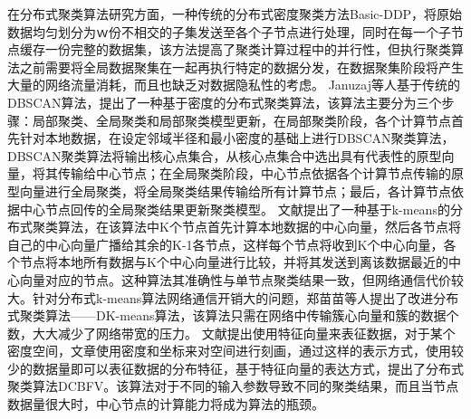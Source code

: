 在分布式聚类算法研究方面，一种传统的分布式密度聚类方法Basic-DDP，将原始数据均匀划分为ｗ份不相交的子集发送至各个子节点进行处理，同时在每一个子节点缓存一份完整的数据集，该方法提高了聚类计算过程中的并行性，但执行聚类算法之前需要将全局数据聚集在一起再执行特定的数据分发，在数据聚集阶段将产生大量的网络流量消耗，而且也缺乏对数据隐私性的考虑。
Januzaj等人基于传统的DBSCAN算法，提出了一种基于密度的分布式聚类算法，该算法主要分为三个步骤：局部聚类、全局聚类和局部聚类模型更新，在局部聚类阶段，各个计算节点首先针对本地数据，在设定邻域半径和最小密度的基础上进行DBSCAN聚类算法，DBSCAN聚类算法将输出核心点集合，从核心点集合中选出具有代表性的原型向量，将其传输给中心节点；在全局聚类阶段，中心节点依据各个计算节点传输的原型向量进行全局聚类，将全局聚类结果传输给所有计算节点；最后，各计算节点依据中心节点回传的全局聚类结果更新聚类模型。
文献\cite{kantabutra2000parallel}提出了一种基于k-means的分布式聚类算法，在该算法中K个节点首先计算本地数据的中心向量，然后各节点将自己的中心向量广播给其余的K-1各节点，这样每个节点将收到K个中心向量，各个节点将本地所有数据与K个中心向量进行比较，并将其发送到离该数据最近的中心向量对应的节点。这种算法其准确性与单节点聚类结果一致，但网络通信代价较大。针对分布式k-means算法网络通信开销大的问题，郑苗苗等人提出了改进分布式聚类算法——DK-means算法，该算法只需在网络中传输簇心向量和簇的数据个数，大大减少了网络带宽的压力。
文献\cite{李锁花基于特征向量的分布式聚类算法}提出使用特征向量来表征数据，对于某个密度空间，文章使用密度和坐标来对空间进行刻画，通过这样的表示方式，使用较少的数据量即可以表征数据的分布特征，基于特征向量的表达方式，提出了分布式聚类算法DCBFV。该算法对于不同的输入参数导致不同的聚类结果，而且当节点数据量很大时，中心节点的计算能力将成为算法的瓶颈。

